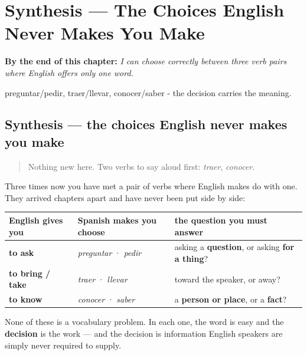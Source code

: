 
\chapter{Synthesis --- The Choices English Never Makes You Make}
\label{ch:spanish-synthesis-verb-splits}

\begin{chapteropening}
\textbf{By the end of this chapter:} \emph{I can choose correctly between three verb pairs where English offers only one word.}

preguntar/pedir, traer/llevar, conocer/saber - the decision carries the meaning.
\end{chapteropening}

\section[Practice]{Synthesis — the choices English never makes you make}

\label{lesson:ES-C39-sintesis-elegir}



\begin{quote}
Nothing new here. Two verbs to say aloud first: \emph{traer}, \emph{conocer}.
\end{quote}

\begin{grammarlens}[title={Grammar Lens: one English word, two Spanish verbs}]
Three times now you have met a pair of verbs where English makes do with one. They arrived chapters apart and have never been put side by side:

\noindent
\begin{tabularx}{\linewidth}{@{}>{\raggedright\arraybackslash}X>{\raggedright\arraybackslash}X>{\raggedright\arraybackslash}X@{}}
\toprule
\textbf{English gives you} & \textbf{Spanish makes you choose} & \textbf{the question you must answer} \\
\midrule
\textbf{to ask} & \emph{preguntar} · \emph{pedir} & asking a \textbf{question}, or asking \textbf{for a thing}? \\
\textbf{to bring / take} & \emph{traer} · \emph{llevar} & toward the speaker, or away? \\
\textbf{to know} & \emph{conocer} · \emph{saber} & a \textbf{person or place}, or a \textbf{fact}? \\
\bottomrule
\end{tabularx}

None of these is a vocabulary problem. In each one, the word is easy and the \textbf{decision} is the work — and the decision is information English speakers are simply never required to supply.
\end{grammarlens}

